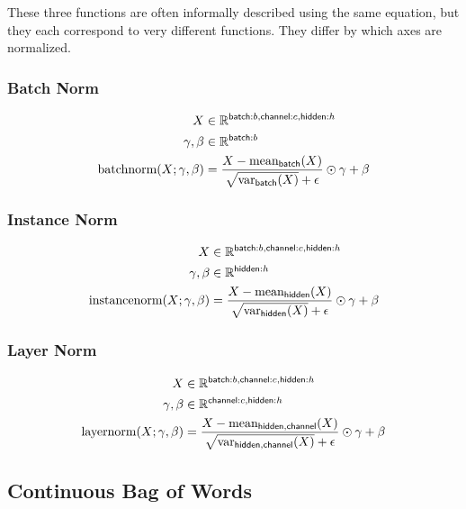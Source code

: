 \documentclass{article}
\newcommand{\name}[1]{\mathsf{#1}}
\newcommand{\nfun}[2]{\mathop{\text{#2}}\displaylimits_{\name{#1}}}
\newcommand{\reals}{\mathbb{R}}
\begin{document}
These three functions are often informally described using the same
equation, but they each correspond to very different functions. They differ
by which axes are normalized.

\subsubsection*{Batch Norm}

\begin{align*} 
X &\in \reals^{{\name{batch}:b, \name{channel}:c, \name{hidden}:h}}\\
\gamma, \beta &\in \reals^{{\name{batch}:b}} \\
\text{batchnorm}(X; \gamma, \beta) &= \frac{X - \nfun{batch}{mean}(X)}{\sqrt{\nfun{batch}{var}(X)} + \epsilon } \odot \gamma + \beta
\end{align*}


\subsubsection*{Instance Norm}

\begin{align*} 
X &\in \reals^{{\name{batch}:b, \name{channel}:c, \name{hidden}:h}}\\
\gamma, \beta &\in \reals^{{\name{hidden}:h}} \\
\text{instancenorm}(X; \gamma, \beta) &= \frac{X - \nfun{hidden}{\text{mean}}(X)}{\sqrt{\nfun{hidden}{\text{var}}(X)} + \epsilon } \odot \gamma + \beta
\end{align*}

\subsubsection*{Layer Norm}

\begin{align*} 
X &\in \reals^{{\name{batch}:b, \name{channel}:c, \name{hidden}:h}} \\
\gamma, \beta &\in \reals^{{\name{channel}:c, \name{hidden}:h}} \\
\text{layernorm}(X; \gamma, \beta) &= \frac{X - \nfun{hidden,channel}{\text{mean}}(X)}{\sqrt{\nfun{hidden, channel}{\text{var}}(X)} + \epsilon } \odot \gamma + \beta 
\end{align*}


\subsection{Continuous Bag of Words}
\end{document}
